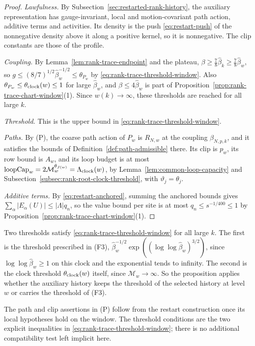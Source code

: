 \begin{proof}
\emph{Lawfulness.} By Subsection~\ref{sec:restarted-rank-history}, the
auxiliary representation has gauge-invariant, local and motion-covariant
path action, additive terms and activities. Its density is the push
\eqref{eq:restart-push} of the nonnegative density above it along a
positive kernel, so it is nonnegative. The clip constants are those of the
profile.

\emph{Coupling.} By Lemma~\ref{lem:rank-trace-endpoint} and the plateau,
$\beta\ge\tfrac78\widehat\beta_k\ge\tfrac78\widehat\beta_w$, so
$g\le(8/7)^{1/2}\widehat\beta_w^{-1/2}\le\theta_{P_w}$ by
\eqref{eq:rank-trace-threshold-window}. Also
$\theta_{P_w}\le\theta_{\rm clock}(w)\le1$ for large $\widehat\beta_w$, and
$\beta\le4\widehat\beta_w$ is part of
Proposition~\ref{prop:rank-trace-chart-window}(1). Since $w(k)\to\infty$,
these thresholds are reached for all large $k$.

\emph{Threshold.} This is the upper bound in
\eqref{eq:rank-trace-threshold-window}.

\emph{Paths.} By (P), the coarse path action of $P_w$ is $R_{N,w}$ at the
coupling $\beta_{N,p,k}$, and it satisfies the bounds of
Definition~\ref{def:path-admissible} there. Its clip is $p_w$, its row
bound is $A_w$, and its loop budget is at most
$\mathrm{loopCap}_w=2\mathcal M_w^{\theta_{J(w)}}=\Lambda_{\rm clock}(w)$, by
Lemma~\ref{lem:common-loop-capacity} and
Subsection~\ref{subsec:rank-root-clock-threshold}, with
$\vartheta_j=\theta_j$.

\emph{Additive terms.} By \eqref{eq:restart-anchored}, summing the
anchored bounds gives $\sum_\alpha|E_\alpha(U)|\le|\Lambda|q_n$, so the
value bound per site is at most $q_n\le s^{-1/400}\le1$ by
Proposition~\ref{prop:rank-trace-chart-window}(1).
\end{proof}

Two thresholds satisfy \eqref{eq:rank-trace-threshold-window} for all
large $k$. The first is the threshold prescribed in (F3),
$\widehat\beta_w^{-1/2}\exp((\log\log\widehat\beta_w)^{3/2})$, since
$\log\log\widehat\beta_w\ge1$ on this clock and the exponential tends
to infinity. The second is the clock threshold $\theta_{\rm clock}(w)$
itself, since $\mathcal M_w\to\infty$. So the proposition applies whether
the auxiliary history keeps the threshold of the selected history at
level $w$ or carries the threshold of (F3).

The path and clip assertions in (P) follow from the restart construction
once its local hypotheses hold on the window. The threshold conditions
are the two explicit inequalities in
\eqref{eq:rank-trace-threshold-window}; there is no additional
compatibility test left implicit here.

